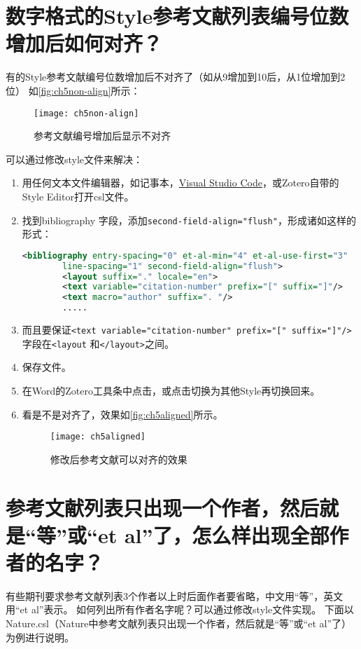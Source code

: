 \documentclass[theorem=false,mathfont=none,openany,sub3section]{easybook}
\begin{document}
{\section{数字格式的Style参考文献列表编号位数增加后如何对齐？}\label{sec:align}	
有的Style参考文献编号位数增加后不对齐了（如从9增加到10后，从1位增加到2位）
如\autoref{fig:ch5non-align}所示：
\begin{figure}[ht]
	\centering
	\texttt{[image: ch5non-align]}
	\caption{参考文献编号增加后显示不对齐}
	\label{fig:ch5non-align}
\end{figure}
可以通过修改style文件来解决：
\begin{enumerate}
	\item 用任何文本文件编辑器，如记事本，\href{https://code.visualstudio.com/}{Visual Studio Code}，或Zotero自带的Style Editor打开csl文件。
	\item 找到bibliography 字段，添加\verb|second-field-align="flush"|，形成诸如这样的形式：
	
	\begin{lstlisting}[language=XML]	
		<bibliography entry-spacing="0" et-al-min="4" et-al-use-first="3"
		line-spacing="1" second-field-align="flush">
		<layout suffix="." locale="en">
		<text variable="citation-number" prefix="[" suffix="]"/>
		<text macro="author" suffix=". "/>
		.....
	\end{lstlisting}
	\item 而且要保证\verb|<text variable="citation-number" prefix="[" suffix="]"/>|
	字段在\verb|<layout| 和\verb|</layout>|之间。
	\item 保存文件。
	\item 在Word的Zotero工具条中点击，或点击切换为其他Style再切换回来。
	\item 看是不是对齐了，效果如\autoref{fig:ch5aligned}所示。
	\begin{figure}[ht]
		\centering
		\texttt{[image: ch5aligned]}
		\caption{修改后参考文献可以对齐的效果}
		\label{fig:ch5aligned}
	\end{figure}
\end{enumerate}

\section{参考文献列表只出现一个作者，然后就是“等”或“et al”了，怎么样出现全部作者的名字？}\label{sec:more-author}	

有些期刊要求参考文献列表3个作者以上时后面作者要省略，中文用“等”，英文用“et al”表示。
如何列出所有作者名字呢？可以通过修改style文件实现。
下面以Nature.csl（Nature中参考文献列表只出现一个作者，然后就是“等”或“et al”了）为例进行说明。

}
\end{document}
